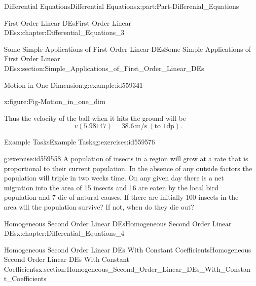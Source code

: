 \documentclass[oneside,10pt,]{book}
\numberwithin{equation}{section}
\begin{document}
\begin{partptx}{Differential Equations}{}{Differential Equations}{}{}{x:part:Part-Differenial_Equations}
\begin{chapterptx}{First Order Linear DEs}{}{First Order Linear DEs}{}{}{x:chapter:Differential_Equations_3}
\begin{sectionptx}{Some Simple Applications of First Order Linear DEs}{}{Some Simple Applications of First Order Linear DEs}{}{}{x:section:Simple_Applications_of_First_Order_Linear_DEs}
\begin{example}{Motion in One Dimension.}{g:example:id559341}
\begin{figureptx}{}{x:figure:Fig-Motion_in_one_dim}{}
\begin{image}{0.15}{0.7}{0.15}
\end{image}%
\tcblower
\end{figureptx}%
Thus the velocity of the ball when it hits the ground will be%
\begin{equation*}
v(5.98147) = 38.6 \, \text{m/s} \: (\text{to 1dp})\text{.}
\end{equation*}
%
\end{example}
%
%
\typeout{************************************************}
\typeout{************************************************}
%
\begin{exercises-subsection-numberless}{Example Tasks}{}{Example Tasks}{}{}{g:exercises:id559576}
\begin{divisionexercise}{1}{}{}{g:exercise:id559558}%
A population of insects in a region will grow at a rate that is proportional to their current population.  In the absence of any outside factors the population will triple in two weeks time.  On any given day there is a net migration into the area of 15 insects and 16 are eaten by the local bird population and 7 die of natural causes.  If there are initially 100 insects in the area will the population survive?  If not, when do they die out?%
\end{divisionexercise}%
\end{exercises-subsection-numberless}
\end{sectionptx}
\end{chapterptx}
%
\typeout{************************************************}
\typeout{************************************************}
%
\begin{chapterptx}{Homogeneous Second Order Linear DEs}{}{Homogeneous Second Order Linear DEs}{}{}{x:chapter:Differential_Equations_4}
%
%
\typeout{************************************************}
\typeout{************************************************}
%
\begin{sectionptx}{Homogeneous Second Order Linear DEs With Constant Coefficients}{}{Homogeneous Second Order Linear DEs With Constant Coefficients}{}{}{x:section:Homogeneous_Second_Order_Linear_DEs_With_Constant_Coefficients}

\end{sectionptx}
\end{chapterptx}
\end{partptx}
\end{document}
